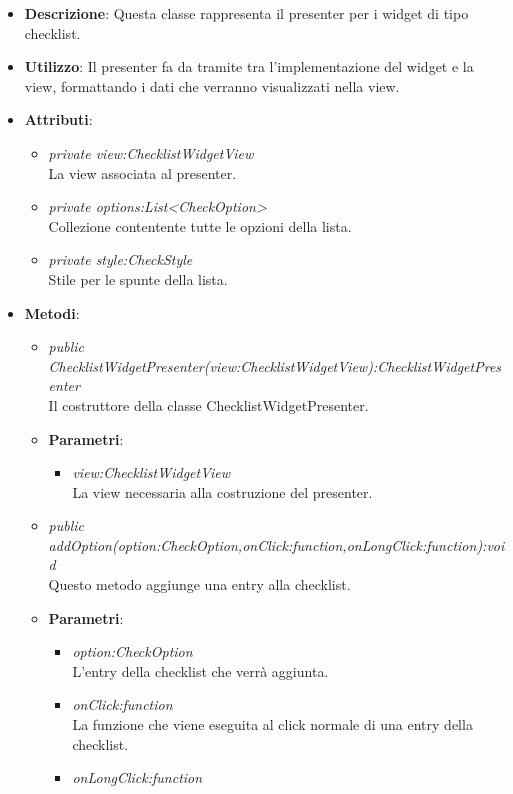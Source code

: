 \begin{itemize}
\item \textbf{Descrizione}: Questa classe rappresenta il presenter per i widget di tipo checklist.
\item \textbf{Utilizzo}: Il presenter fa da tramite tra l'implementazione del widget e la view, formattando i dati che verranno visualizzati nella view.
\item \textbf{Attributi}:
	\begin{itemize}
	\item \textit{private view:ChecklistWidgetView}\\
	La view associata al presenter.
	\item \textit{private options:List<CheckOption>}\\
	Collezione contentente tutte le opzioni della lista.
	\item \textit{private style:CheckStyle}\\
	Stile per le spunte della lista.
	\end{itemize}
\item \textbf{Metodi}:
	\begin{itemize}
	\item \textit{public ChecklistWidgetPresenter(view:ChecklistWidgetView):ChecklistWidgetPresenter}\\
	Il costruttore della classe ChecklistWidgetPresenter.
		\item{\textbf{Parametri}: \begin{itemize}
		\item \textit{view:ChecklistWidgetView}\\
		La view necessaria alla costruzione del presenter.
		\end{itemize}}
	\item \textit{public addOption(option:CheckOption,onClick:function,onLongClick:function):void}\\
	Questo metodo aggiunge una entry alla checklist.
		\item{\textbf{Parametri}: \begin{itemize}
		\item \textit{option:CheckOption}\\
		L'entry della checklist che verrà aggiunta.
		\item \textit{onClick:function}\\
		La funzione che viene eseguita al click normale di una entry della checklist.
		\item \textit{onLongClick:function}\\

\end{itemize}}
\end{itemize}
\end{itemize}

